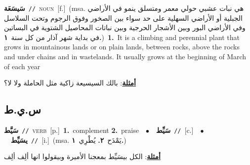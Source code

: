 \documentclass[10pt,a4paper,twoside]{article} %
\begin{document}
\begin{multicols}{2}
{\setlength\topsep{0pt}\textbf{\foreignlanguage{arabic}{سَيسَعَة}}\ {\color{gray}\texttt{//}\color{black}}\ \textsc{noun}\ [f.]\ \color{gray}(msa. \foreignlanguage{arabic}{هي نبات عشبي حولي معمر ومتسلق ينمو في الأراضي الجبلية أو الأراضي السهلية على حد سواء بين الصخور وفوق الرجوم وتحت السلاسل وفي الأراضي البور وبين الأشجار الحرجية وبين نباتات المحاصيل الشتوية في البساتين في بداية شهر آذار من كل سنة}~\foreignlanguage{arabic}{\textbf{١.}})\color{black}\ \textbf{1.}~It is a climbing and perennial plant that grows in mountainous lands or on plain lands, between rocks, above the rocks and under chains and in wastelands. It usually grows at the beginning of March of each year\  \begin{flushright}\color{gray}\foreignlanguage{arabic}{\textbf{\underline{\foreignlanguage{arabic}{أمثلة}}}: بالك السيسيعة زاكية مثل الحاملة ولا لا؟}\end{flushright}\color{black}} \vspace{2mm}

\vspace{-3mm}
\subsection*{\color{blue}\foreignlanguage{arabic}{س.ي.ط}\color{blue}{}} 

{\setlength\topsep{0pt}\textbf{\foreignlanguage{arabic}{سَيَّط}}\ {\color{gray}\texttt{//}\color{black}}\ \textsc{verb}\ [p.]\ \textbf{1.}~complement  \textbf{2.}~praise\ \ $\bullet$\ \ \setlength\topsep{0pt}\textbf{\foreignlanguage{arabic}{سَيِّط}}\ {\color{gray}\texttt{//}\color{black}}\ [c.]\ \ $\bullet$\ \ \setlength\topsep{0pt}\textbf{\foreignlanguage{arabic}{يسَيِّط}}\ {\color{gray}\texttt{//}\color{black}}\ [i.]\ \color{gray}(msa. \foreignlanguage{arabic}{يَمْدَح}~\foreignlanguage{arabic}{\textbf{٢.}}  \foreignlanguage{arabic}{يُطْرِي}~\foreignlanguage{arabic}{\textbf{١.}})\color{black}\  \begin{flushright}\color{gray}\foreignlanguage{arabic}{\textbf{\underline{\foreignlanguage{arabic}{أمثلة}}}: الكل بيسَيِّط بمعجنا الأميرة وبيقولوا انها ألِف ألِف}\end{flushright}\color{black}} \vspace{2mm}


\end{multicols}
\end{document}
